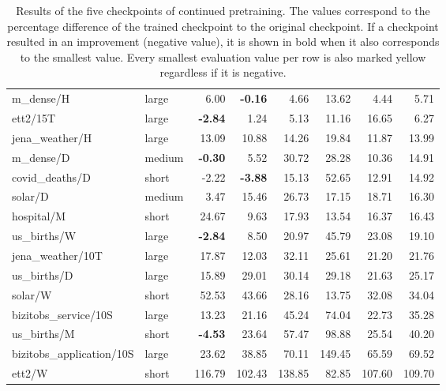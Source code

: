 \begin{table}[H]
{\begin{tabular}{l l r r r r r r}
m\_dense/H & large & 6.00 & \cellcolor{yellow}\textbf{-0.16} & 4.66 & 13.62 & 4.44 & 5.71 \\
ett2/15T & large & \cellcolor{yellow}\textbf{-2.84} & 1.24 & 5.13 & 11.16 & 16.65 & 6.27 \\
jena\_weather/H & large & 13.09 & \cellcolor{yellow}10.88 & 14.26 & 19.84 & 11.87 & 13.99 \\
m\_dense/D & medium & \cellcolor{yellow}\textbf{-0.30} & 5.52 & 30.72 & 28.28 & 10.36 & 14.91 \\
covid\_deaths/D & short & -2.22 & \cellcolor{yellow}\textbf{-3.88} & 15.13 & 52.65 & 12.91 & 14.92 \\
solar/D & medium & \cellcolor{yellow}3.47 & 15.46 & 26.73 & 17.15 & 18.71 & 16.30 \\
hospital/M & short & 24.67 & \cellcolor{yellow}9.63 & 17.93 & 13.54 & 16.37 & 16.43 \\
us\_births/W & large & \cellcolor{yellow}\textbf{-2.84} & 8.50 & 20.97 & 45.79 & 23.08 & 19.10 \\
jena\_weather/10T & large & 17.87 & \cellcolor{yellow}12.03 & 32.11 & 25.61 & 21.20 & 21.76 \\
us\_births/D & large & \cellcolor{yellow}15.89 & 29.01 & 30.14 & 29.18 & 21.63 & 25.17 \\
solar/W & short & 52.53 & 43.66 & 28.16 & \cellcolor{yellow}13.75 & 32.08 & 34.04 \\
bizitobs\_service/10S & large & \cellcolor{yellow}13.23 & 21.16 & 45.24 & 74.04 & 22.73 & 35.28 \\
us\_births/M & short & \cellcolor{yellow}\textbf{-4.53} & 23.64 & 57.47 & 98.88 & 25.54 & 40.20 \\
bizitobs\_application/10S & large & \cellcolor{yellow}23.62 & 38.85 & 70.11 & 149.45 & 65.59 & 69.52 \\
ett2/W & short & 116.79 & 102.43 & 138.85 & \cellcolor{yellow}82.85 & 107.60 & 109.70 \\
\hline
\end{tabular}
}
\caption{Results of the five checkpoints of continued pretraining. The values correspond to the percentage difference of the trained checkpoint to the original checkpoint. If a checkpoint resulted in an improvement (negative value), it is shown in bold when it also corresponds to the smallest value. Every smallest evaluation value per row is also marked yellow regardless if it is negative. }
\label{tab:prior_results}
\end{table}

